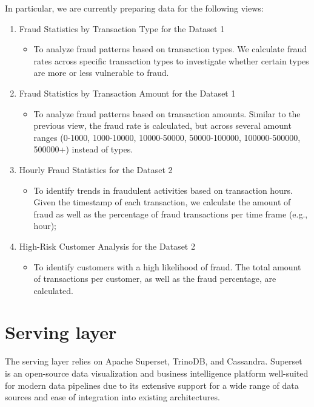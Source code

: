 \documentclass[12pt,a4paper, hidelinks]{article}
\begin{document}
In particular, we are currently preparing data for the following views:
\begin{enumerate}
    \item Fraud Statistics by Transaction Type for the Dataset 1
    \begin{itemize}
        \item To analyze fraud patterns based on transaction types. We calculate fraud rates across specific transaction types to investigate whether certain types are more or less vulnerable to fraud.
    \end{itemize}
    \item Fraud Statistics by Transaction Amount for the Dataset 1
    \begin{itemize}
        \item To analyze fraud patterns based on transaction amounts. Similar to the previous view, the fraud rate is calculated, but across several amount ranges (0-1000, 1000-10000, 10000-50000, 50000-100000, 100000-500000, 500000+) instead of types.
    \end{itemize}
    \item Hourly Fraud Statistics for the Dataset 2
    \begin{itemize}
        \item To identify trends in fraudulent activities based on transaction hours. Given the timestamp of each transaction, we calculate the  amount of fraud as well as the percentage of fraud transactions per time frame (e.g., hour);
    \end{itemize}
    \item High-Risk Customer Analysis for the Dataset 2
    \begin{itemize}
        \item To identify customers with a high likelihood of fraud. The total amount of transactions per customer, as well as the fraud percentage, are calculated.
    \end{itemize}
\end{enumerate}



\section{Serving layer}

The serving layer relies on Apache Superset, TrinoDB, and Cassandra. Superset is an open-source data visualization and business intelligence platform well-suited for modern data pipelines due to its extensive support for a wide range of data sources and ease of integration into existing architectures.
\end{document}
